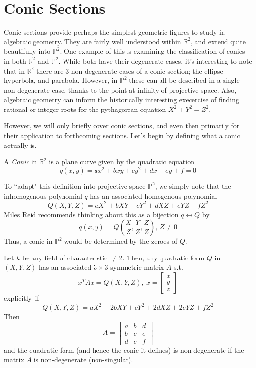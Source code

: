 \section{Conic Sections}

Conic sections provide perhaps the simplest geometric
figures to study in algebraic geometry. They are fairly
well understood within $\mathbb{R}^2$, and extend quite beautifully
into $\mathbb{P}^2$. One example of this is examining 
the classification of conics in both $\mathbb{R}^2$ and
$\mathbb{P}^2$. While both have their degenerate cases,
it's interesting to note that in $\mathbb{R}^2$ there
are 3 non-degenerate cases of a conic section;
the ellipse, hyperbola, and parabola. However, in
$\mathbb{P}^2$ these can all be described in a single
non-degenerate case, thanks to the point at infinity of
projective space. Also, algebraic geometry can inform
the historically interesting execercise of finding
rational or integer roots for the pythagorean equation
$X^2 + Y^2 = Z^2$.

However, we will only briefly cover conic sections, and even
then primarily for their application to forthcoming sections.
Let's begin by defining what a conic actually is.

\begin{mydef}
A \emph{Conic} in $\mathbb{R}^2$ is a plane curve given by the quadratic
equation
\[
q(x,y) = ax^2 + bxy + cy^2 + dx + ey + f = 0
\]
\end{mydef}

To ``adapt" this definition into projective space $\mathbb{P}^2$, we simply
note that the inhomogenous polynomial $q$ has an associated
homogenous polynomial 
\[
Q(X,Y,Z) = aX^2 + bXY + cY^2 + dXZ + eYZ + fZ^2
\]
Miles Reid recommends thinking about this as a bijection $q \leftrightarrow Q$ by
\[
q(x,y) = Q(\frac{X}{Z},\frac{Y}{Z},\frac{Z}{Z}),~Z\ne 0
\]
Thus, a conic in $\mathbb{P}^2$ would be determined by the zeroes of $Q$.

\begin{theorem}
Let $k$ be any field of characteristic $\ne 2$. Then, any quadratic form $Q$
in $(X,Y,Z)$ has an associated $3 \times 3$ symmetric matrix $A$ s.t.
\[
x^TAx =  Q(X,Y,Z),~x=\begin{bmatrix}
x\\
y\\
z
\end{bmatrix}
\]
explicitly, if 
\[
Q(X,Y,Z) = aX^2 + 2bXY + cY^2 + 2dXZ + 2eYZ + fZ^2
\]
Then
\[
A = \begin{bmatrix}
a & b & d\\
b & c & e\\
d & e & f
\end{bmatrix}
\]
and the quadratic form (and hence the conic it defines) is non-degenerate
if the matrix $A$ is non-degenerate (non-singular).
\end{theorem}

